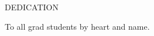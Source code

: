 \newpage
{}

\begin{center}
DEDICATION
\end{center}

\begin{center}
To all grad students by heart and name.
\end{center}

